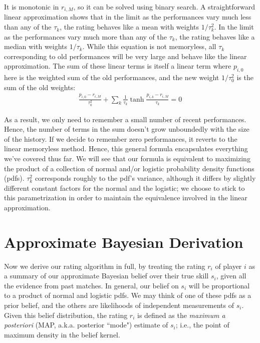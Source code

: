 \documentclass{article}
\begin{document}
It is monotonic in $r_{i,M}$, so it can be solved using binary search. A straightforward linear approximation shows that in the limit as the performances vary much less than any of the $\tau_k$, the rating behaves like a mean with weights $1/\tau_k^2$. In the limit as the performances vary much more than any of the $\tau_k$, the rating behaves like a median with weights $1/\tau_k$. While this equation is not memoryless, all $\tau_k$ corresponding to old performances will be very large and behave like the linear approximation. The sum of these linear terms is itself a linear term where $p_{i,0}$ here is the weighted sum of the old performances, and the new weight $1/\tau_0^2$ is the sum of the old weights:
\begin{align}
\frac{p_{i,0} - r_{i,M}}{\tau_0^2} + \sum_k \frac {1}{\tau_k} \tanh\frac{p_{i,k} - r_{i,M}}{\tau_k} = 0
\end{align}

As a result, we only need to remember a small number of recent performances. Hence, the number of terms in the sum doesn't grow unboundedly with the size of the history. If we decide to remember zero performances, it reverts to the linear memoryless method. Hence, this general formula encapsulates everything we've covered thus far. We will see that our formula is equivalent to maximizing the product of a collection of normal and/or logistic probability density functions (pdfs). $\tau_k^2$ corresponds roughly to the pdf's variance, although it differs by slightly different constant factors for the normal and the logistic; we choose to stick to this parametrization in order to maintain the equivalence involved in the linear approximation.

\section{Approximate Bayesian Derivation}

Now we derive our rating algorithm in full, by treating the rating $r_i$ of player $i$ as a summary of our approximate Bayesian belief over their true skill $s_i$, given all the evidence from past matches. In general, our belief on $s_i$ will be proportional to a product of normal and logistic pdfs. We may think of one of these pdfs as a prior belief, and the others are likelihoods of independent measurements of $s_i$. Given this belief distribution, the rating $r_i$ is defined as the \emph{maximum a posteriori} (MAP, a.k.a. posterior ``mode") estimate of $s_i$; i.e., the point of maximum density in the belief kernel.
\end{document}

